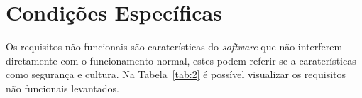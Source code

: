 \newpage
\section{Condições Específicas}

Os requisitos não funcionais são caraterísticas do \textit{software} que não interferem diretamente com o funcionamento normal, estes podem referir-se a caraterísticas como segurança e cultura. Na Tabela~\ref{tab:2} é possível visualizar os requisitos não funcionais levantados.

